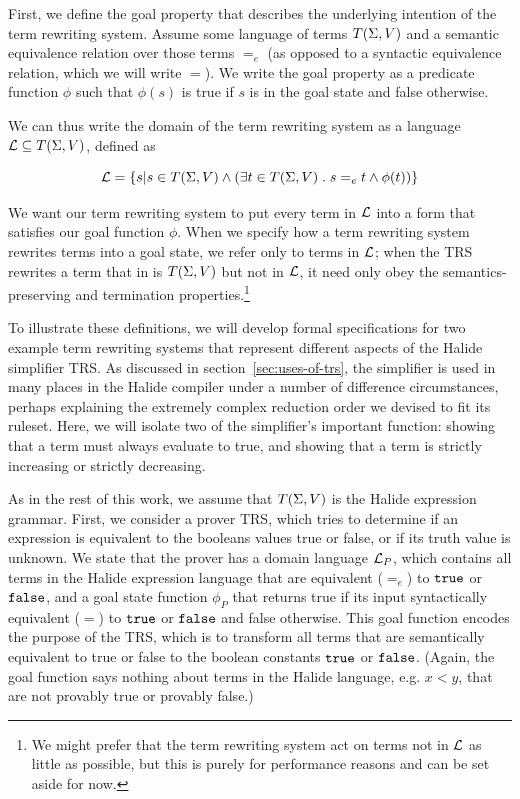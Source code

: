 First, we define the goal property that describes the underlying intention of the term rewriting system. Assume some language of terms $T(\Sigma,V)$ and a semantic equivalence relation over those terms $=_e$ (as opposed to a syntactic equivalence relation, which we will write $=$). We write the goal property as a predicate function $\phi$ such that $\phi(s)$ is true if $s$ is in the goal state and false otherwise. 

We can thus write the domain of the term rewriting system as a language $\mathcal{L} \subseteq T(\Sigma,V)$, defined as

\[
\mathcal{L} = \{s | s \in T(\Sigma,V) \wedge (\exists t \in T(\Sigma,V)\;.\; s =_e t \wedge \phi(t))\}
\]

We want our term rewriting system to put every term in $\mathcal{L}$ into a form that satisfies our goal function $\phi$. When we specify how a term rewriting system rewrites terms into a goal state, we refer only to terms in $\mathcal{L}$; when the TRS rewrites a term that in is $T(\Sigma,V)$ but not in $\mathcal{L}$, it need only obey the semantics-preserving and termination properties.\footnote{We might prefer that the term rewriting system act on terms not in $\mathcal{L}$ as little as possible, but this is purely for performance reasons and can be set aside for now.}

To illustrate these definitions, we will develop formal specifications for two example term rewriting systems that represent different aspects of the Halide simplifier TRS. As discussed in section~\ref{sec:uses-of-trs}, the simplifier is used in many places in the Halide compiler under a number of difference circumstances, perhaps explaining the extremely complex reduction order we devised to fit its ruleset. Here, we will isolate two of the simplifier's important function: showing that a term must always evaluate to true, and showing that a term is strictly increasing or strictly decreasing.

 As in the rest of this work, we assume that $T(\Sigma,V)$ is the Halide expression grammar. First, we consider a prover TRS, which tries to determine if an expression is equivalent to the booleans values true or false, or if its truth value is unknown. We state that the prover has a domain language $\mathcal{L}_P$, which contains all terms in the Halide expression language that are equivalent ($=_e$) to $\texttt{true}$ or $\texttt{false}$, and a goal state function $\phi_P$ that returns true if its input syntactically equivalent ($=$) to $\texttt{true}$ or $\texttt{false}$ and false otherwise. This goal function encodes the purpose of the TRS, which is to transform all terms that are semantically equivalent to true or false to the boolean constants $\texttt{true}$ or $\texttt{false}$. (Again, the goal function says nothing about terms in the Halide language, e.g. $x < y$, that are not provably true or provably false.)

